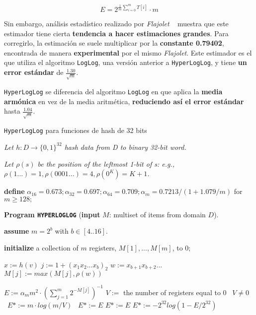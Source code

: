 $$ E = 2 ^ { \frac{1}{m} \sum\limits_{i=0}^{m}\! T[i] } \cdot m $$

Sin embargo, análisis estadístico realizado por \emph{Flajolet} ~\cite{hll:HyperLogLog} muestra que este estimador
tiene cierta \textbf{tendencia a hacer estimaciones grandes}. Para corregirlo, la estimación se suele multiplicar por la
\textbf{constante 0.79402}, encontrada de manera \textbf{experimental} por el mismo \emph{Flajolet}.
Este estimador es el que utiliza el algoritmo \texttt{LogLog}, una versión anterior a \texttt{HyperLogLog}, y tiene
\textbf{un error estándar} de  $\frac{1.30}{\sqrt{m}}$.

\texttt{HyperLogLog} se diferencia del algoritmo \texttt{LogLog} en que aplica la \textbf{media armónica} en vez de la
media aritmética, \textbf{reduciendo así el error estándar} hasta $\frac{1.04}{\sqrt{m}}$.

\begin{algorithm}[h]
\caption{\texttt{HyperLogLog} para funciones de hash de 32 bits}
\textit{Let $h: D\rightarrow \{0,1\}^{32}$ hash data from D to binary 32-bit word.}

\textit{Let $\rho(s)$ be the position of the leftmost 1-bit of s: e.g.,
$\rho(1...) = 1, \rho(0001...) = 4, \rho(0^K) = K + 1$.}

\textbf{define} $\alpha_{16}=0.673;\alpha_{32}=0.697;\alpha_{64}=0.709;\alpha_m=0.7213/(1+1.079/m)$
for $m \geq 128;$

\textbf{Program \texttt{HYPERLOGLOG}} (\textbf{input} $M$: multiset of items from domain $D$).

\textbf{assume} $m=2^b$ with $ b\in[4..16]$.

\textbf{initialize} a collection of $m$ registers, $M[1],...,M[m]$, to 0;

\begin{algorithmic}
            \STATE $x  := h(v)$
            \STATE $j   := 1 + (x_1 x_2 ... x_b)_2$ 
            \STATE $w := x_{b+1} x_{b+2} ... $
            \STATE $M[j] := max(M[j],\rho(w))$
    \ENDFOR

    \STATE $E:=\alpha _m m^2·\left(\sum\limits_{j=1}^m 2^{-M[j]}\right)^{-1}$ 
        \STATE $V :=$ the number of registers equal to $0$
        \STATE \algorithmicif\ $V \neq 0$ \algorithmicthen\ $E* := m \cdot log(m / V)$ \algorithmicelse\ $E* := E$
    \ENDIF
        \STATE $E*:=E$ 
    \ELSE
        \STATE $E* := -2^{32}log(1-E/2^{32})$ 
    \ENDIF
\end{algorithmic}
\end{algorithm}

